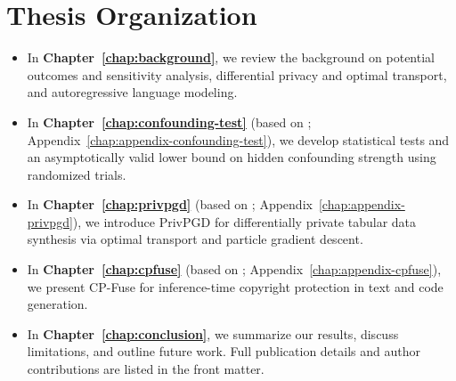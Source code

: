 \section{Thesis Organization}
\label{sec:intro-org}

\begin{itemize}[leftmargin=*, itemsep=0.35em, topsep=0.3em]
  \item In \textbf{Chapter~\ref{chap:background}}, we review the background on potential outcomes and sensitivity analysis, differential privacy and optimal transport, and autoregressive language modeling.
  \item In \textbf{Chapter~\ref{chap:confounding-test}} (based on \citet{de2023hidden}; Appendix~\ref{chap:appendix-confounding-test}), we develop statistical tests and an asymptotically valid lower bound on hidden confounding strength using randomized trials.
  \item In \textbf{Chapter~\ref{chap:privpgd}} (based on \citet{donhauser2024privacy}; Appendix~\ref{chap:appendix-privpgd}), we introduce PrivPGD for differentially private tabular data synthesis via optimal transport and particle gradient descent.
  \item In \textbf{Chapter~\ref{chap:cpfuse}} (based on \citet{abad2025copyright}; Appendix~\ref{chap:appendix-cpfuse}), we present CP-Fuse for inference-time copyright protection in text and code generation.
  \item In \textbf{Chapter~\ref{chap:conclusion}}, we summarize our results, discuss limitations, and outline future work. Full publication details and author contributions are listed in the front matter.
\end{itemize}
